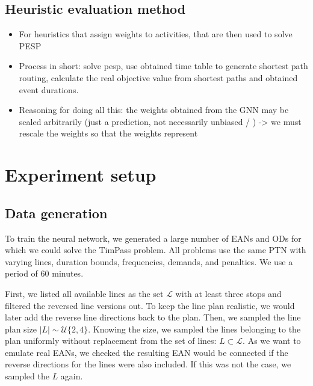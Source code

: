 \documentclass[english, 12pt, a4paper, sci, utf8, a-2b, online]{aaltothesis}
\newcommand{\unif}[1]{\mathcal{U}\{#1\}}
\begin{document}
\subsection{Heuristic evaluation method}
\begin{itemize}
    \item For heuristics that assign weights to activities, that are then used to solve PESP
    \item Process in short: solve pesp, use obtained time table to generate shortest path routing, calculate the real objective value from shortest paths and obtained event durations.
    \item Reasoning for doing all this: the weights obtained from the GNN may be scaled arbitrarily (just a prediction, not necessarily unbiased / ) -> we must rescale the weights so that the weights represent 
\end{itemize}

\clearpage
\section{Experiment setup}
\subsection{Data generation}

To train the neural network, we generated a large number of EANs and ODs for which we could solve the TimPass problem. All problems use the same PTN with varying lines, duration bounds, frequencies, demands, and penalties. We use a period of 60 minutes.

First, we listed all available lines as the set $\mathcal{L}$ with at least three stops and filtered the reversed line versions out. To keep the line plan realistic, we would later add the reverse line directions back to the plan. Then, we sampled the line plan size $|L| \sim \unif{2, 4}$. Knowing the size, we sampled the lines belonging to the plan uniformly without replacement from the set of lines: $L \subset \mathcal{L}$. As we want to emulate real EANs, we checked the resulting EAN would be connected if the reverse directions for the lines were also included. If this was not the case, we sampled the $L$ again.
\end{document}
